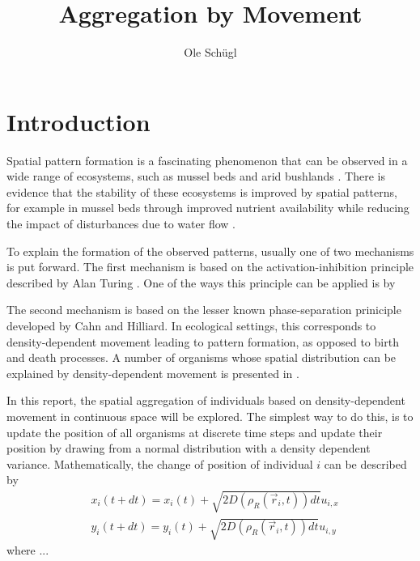 \documentclass{article}
\title{Aggregation by Movement}
\author{Ole Schügl}
\begin{document}
\maketitle

\section{Introduction}
Spatial pattern formation is a fascinating phenomenon that can be observed in a wide range of ecosystems, such as mussel beds and arid bushlands \autocite{liuPhaseSeparationDriven2016,rietkerkSelfOrganizationVegetationArid}. 
There is evidence that the stability of these ecosystems is improved by spatial patterns, for example in mussel beds through improved nutrient availability while reducing the impact of disturbances due to water flow \autocite{vandekoppelExperimentalEvidenceSpatial2008}.

To explain the formation of the observed patterns, usually one of two mechanisms is put forward.
The first mechanism is based on the activation-inhibition principle described by Alan Turing \autocite{turingChemicalBasisMorphogenesis1952}.
One of the ways this principle can be applied is by 

The second mechanism is based on the lesser known phase-separation priniciple developed by Cahn and Hilliard. 
In ecological settings, this corresponds to density-dependent movement leading to pattern formation, as opposed to birth and death processes. A number of organisms whose spatial distribution can be explained by density-dependent movement is presented in \autocite{liuPhaseSeparationDriven2016}.

In this report, the spatial aggregation of individuals based on density-dependent movement in continuous space will be explored.
The simplest way to do this, is to update the position of all organisms at discrete time steps and update their position by drawing from a normal distribution with a density dependent variance.
Mathematically, the change of position of individual $i$ can be described by
\begin{align}
    & x_i(t + dt) = x_i(t) + \sqrt{2D(\rho_R(\vec{r}_i, t)) dt} u_{i,x} \\
    & y_i(t + dt) = y_i(t) + \sqrt{2D(\rho_R(\vec{r}_i, t)) dt} u_{i,y}
\end{align}
where ...

\end{document}
